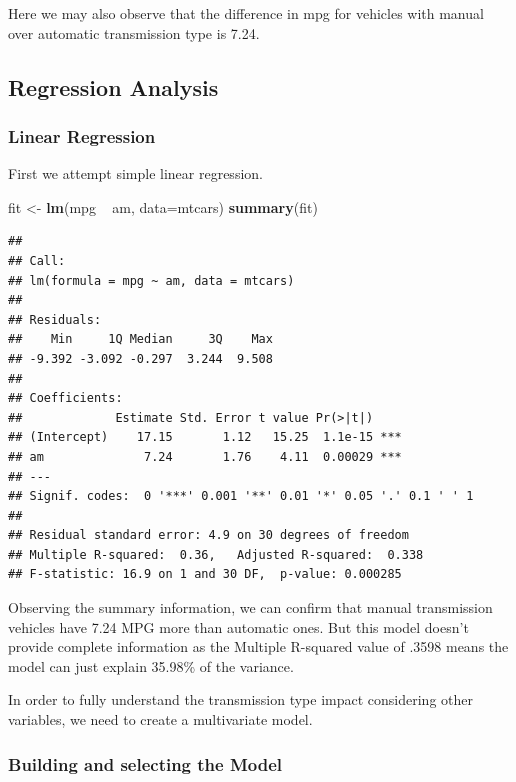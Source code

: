 \documentclass[]{article}
\newenvironment{Shaded}{\begin{snugshade}}{\end{snugshade}}
\newcommand{\KeywordTok}[1]{\textcolor[rgb]{0.13,0.29,0.53}{\textbf{{#1}}}}
\newcommand{\DataTypeTok}[1]{\textcolor[rgb]{0.13,0.29,0.53}{{#1}}}
\newcommand{\StringTok}[1]{\textcolor[rgb]{0.31,0.60,0.02}{{#1}}}
\newcommand{\NormalTok}[1]{{#1}}
\begin{document}
Here we may also observe that the difference in mpg for vehicles with
manual over automatic transmission type is 7.24.

\subsection{Regression Analysis}\label{regression-analysis}

\subsubsection{Linear Regression}\label{linear-regression}

First we attempt simple linear regression.

\begin{Shaded}
\begin{Highlighting}[]
\NormalTok{fit <-}\StringTok{ }\KeywordTok{lm}\NormalTok{(mpg ~}\StringTok{ }\NormalTok{am, }\DataTypeTok{data=}\NormalTok{mtcars)}
\KeywordTok{summary}\NormalTok{(fit)}
\end{Highlighting}
\end{Shaded}

\begin{verbatim}
## 
## Call:
## lm(formula = mpg ~ am, data = mtcars)
## 
## Residuals:
##    Min     1Q Median     3Q    Max 
## -9.392 -3.092 -0.297  3.244  9.508 
## 
## Coefficients:
##             Estimate Std. Error t value Pr(>|t|)    
## (Intercept)    17.15       1.12   15.25  1.1e-15 ***
## am              7.24       1.76    4.11  0.00029 ***
## ---
## Signif. codes:  0 '***' 0.001 '**' 0.01 '*' 0.05 '.' 0.1 ' ' 1
## 
## Residual standard error: 4.9 on 30 degrees of freedom
## Multiple R-squared:  0.36,   Adjusted R-squared:  0.338 
## F-statistic: 16.9 on 1 and 30 DF,  p-value: 0.000285
\end{verbatim}

Observing the summary information, we can confirm that manual
transmission vehicles have 7.24 MPG more than automatic ones. But this
model doesn't provide complete information as the Multiple R-squared
value of .3598 means the model can just explain 35.98\% of the variance.

In order to fully understand the transmission type impact considering
other variables, we need to create a multivariate model.

\subsubsection{Building and selecting the
Model}\label{building-and-selecting-the-model}
\end{document}
